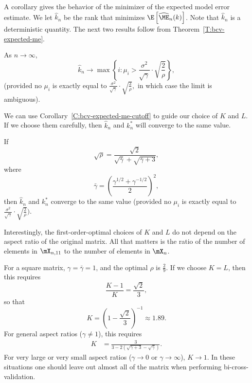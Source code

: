 A corollary gives the behavior of the minimizer of the expected model 
error estimate. We let $\hat k_n$ be the rank that minimizes 
$\E\left[ \widehat{\ME}_n(k) \right]$.  Note that $\hat k_n$ is a deterministic quantity.  The next two results follow from
Theorem~\ref{T:bcv-expected-me}.

\begin{corollary}\label{C:bcv-expected-me-cutoff}
	As $n \to \infty$,
	\begin{equation}
		\hat k_n
			\to
				\max\left\{
					i :
						\mu_i 
						> 
						\frac{\sigma^2}{\sqrt{\gamma}}
						\cdot
						\sqrt{\frac{2}{\rho}}
				\right\},
	\end{equation}
	(provided no $\mu_i$ is exactly equal to
	\(
		\frac{\sigma^2}{\sqrt{\gamma}}
		\cdot
		\sqrt{\frac{2}{\rho}},
	\)
	in which case the limit is ambiguous).
\end{corollary}

We can use Corollary~\ref{C:bcv-expected-me-cutoff} to guide our choice
of $K$ and $L$.  If we choose them carefully, then $\hat k_n$ and
$k^\ast_n$ will converge to the same value.

\begin{corollary}
	If
	\begin{equation}
		\sqrt{\rho}
			=
				\frac{\sqrt{2}}
					 {\sqrt{\bar \gamma} + \sqrt{\bar \gamma + 3}},
	\end{equation}
	where
	\begin{equation}
		\bar \gamma
			=
				\left(
					\frac{\gamma^{1/2} + \gamma^{-1/2}}{2}
				\right)^2,
	\end{equation}
	then $\hat k_n$ and $k^\ast_n$ converge to the same value
	(provided no $\mu_i$ is exactly equal to
		\(
			\frac{\sigma^2}{\sqrt{\gamma}}
			\cdot
			\sqrt{\frac{2}{\rho}}).
		\)
\end{corollary}

Interestingly, the first-order-optimal choices of $K$ and $L$ do not
depend on the aspect ratio of the original matrix.  All that matters
is the ratio of the number of elements in $\mX_{n,11}$ to the number
of elements in $\mX_{n}$.  

For a square matrix, $\gamma = \bar \gamma = 1$, and the optimal 
$\rho$ is $\frac{2}{9}$.  If we choose $K = L$, then this requires
\[
	\frac{K-1}{K}
		=
			\frac{\sqrt{2}}{3},
\]
so that
\[
	K
		=
			\left(
				1
				-
				\frac{\sqrt{2}}{3}
			\right)^{-1}
	\approx
			1.89.
\]
For general aspect ratios ($\gamma \neq 1$), this requires
\begin{align*}
	K
		&=
			\frac{3}{3
					 -
					 2
					 \left(
						 \sqrt{\bar \gamma + 3}
						 -
					     \sqrt{\bar \gamma}
					 \right)}.
\end{align*}
For very large or very small aspect ratios ($\gamma \to 0$ or $\gamma \to \infty$), $K \to 1$.  In these situations one should leave out almost all of the matrix when performing
bi-cross-validation.

